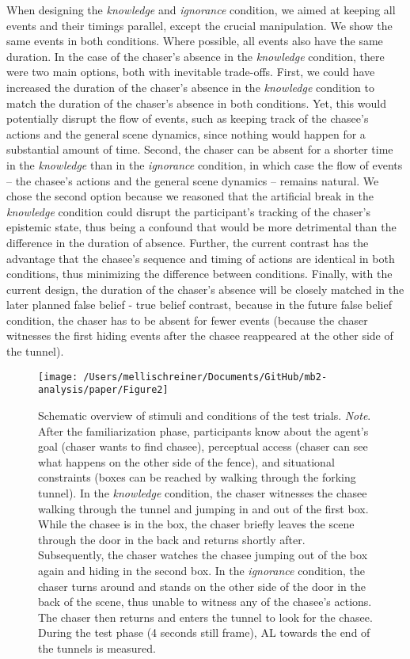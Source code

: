 \documentclass[
  man,floatsintext]{apa6}
\begin{document}
When designing the \emph{knowledge} and \emph{ignorance} condition, we aimed at keeping all events and their timings parallel, except the crucial manipulation. We show the same events in both conditions. Where possible, all events also have the same duration. In the case of the chaser's absence in the \emph{knowledge} condition, there were two main options, both with inevitable trade-offs. First, we could have increased the duration of the chaser's absence in the \emph{knowledge} condition to match the duration of the chaser's absence in both conditions. Yet, this would potentially disrupt the flow of events, such as keeping track of the chasee's actions and the general scene dynamics, since nothing would happen for a substantial amount of time. Second, the chaser can be absent for a shorter time in the \emph{knowledge} than in the \emph{ignorance} condition, in which case the flow of events -- the chasee's actions and the general scene dynamics -- remains natural. We chose the second option because we reasoned that the artificial break in the \emph{knowledge} condition could disrupt the participant's tracking of the chaser's epistemic state, thus being a confound that would be more detrimental than the difference in the duration of absence. Further, the current contrast has the advantage that the chasee's sequence and timing of actions are identical in both conditions, thus minimizing the difference between conditions. Finally, with the current design, the duration of the chaser's absence will be closely matched in the later planned false belief - true belief contrast, because in the future false belief condition, the chaser has to be absent for fewer events (because the chaser witnesses the first hiding events after the chasee reappeared at the other side of the tunnel).

\begin{figure}

{\centering \texttt{[image: /Users/mellischreiner/Documents/GitHub/mb2-analysis/paper/Figure2]} 

}

\caption{Schematic overview of stimuli and conditions of the test trials. \newline{} \textit{Note}. After the familiarization phase, participants know about the agent’s goal (chaser wants to find chasee), perceptual access (chaser can see what happens on the other side of the fence), and situational constraints (boxes can be reached by walking through the forking tunnel). In the \textit{knowledge} condition, the chaser witnesses the chasee walking through the tunnel and jumping in and out of the first box. While the chasee is in the box, the chaser briefly leaves the scene through the door in the back and returns shortly after. Subsequently, the chaser watches the chasee jumping out of the box again and hiding in the second box. In the \textit{ignorance} condition, the chaser turns around and stands on the other side of the door in the back of the scene, thus unable to witness any of the chasee’s actions. The chaser then returns and enters the tunnel to look for the chasee. During the test phase (4 seconds still frame), AL towards the end of the tunnels is measured.}\label{fig:fig2}
\end{figure}
\end{document}

